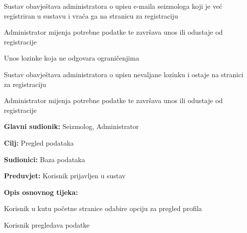 \begin{packed_item}
\begin{packed_item}
\begin{packed_enum}
									\item Sustav obavještava administratora o upisu e-maila seizmologa koji je već registriran u sustavu i vraća ga na stranicu za registraciju
									\item Administrator mijenja potrebne podatke te završava unos ili odustaje od registracije
							\end{packed_enum}
							\item[3.c] Unos lozinke koja ne odgovara ograničenjima
								\item[] \begin{packed_enum}
									\item Sustav obavještava administratora o upisu nevaljane lozinku i ostaje na stranici za registraciju
									\item Administrator mijenja potrebne podatke te završava unos ili odustaje od registracije
								\end{packed_enum}				
						\end{packed_item}
					\end{packed_item}

					\noindent {}
					\begin{packed_item}
	
						\item \textbf{Glavni sudionik:} Seizmolog, Administrator
						\item \textbf{Cilj:} Pregled podataka
						\item \textbf{Sudionici:} Baza podataka
						\item \textbf{Preduvjet:} Korisnik prijavljen u sustav
						\item  \textbf{Opis osnovnog tijeka:}
						
						\item[] \begin{packed_enum}
	
							\item Korisnik u kutu početne stranice odabire opciju za pregled profila
							\item Korisnik pregledava podatke

						\end{packed_enum}						
					\end{packed_item}

